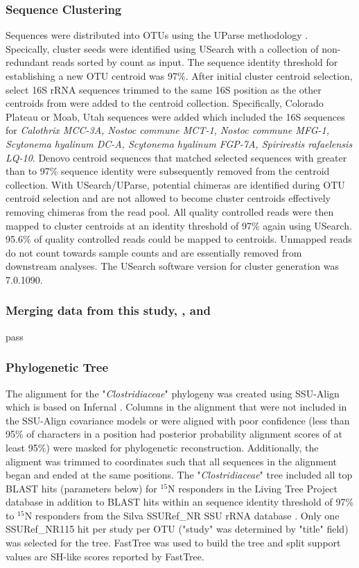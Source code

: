 \subsubsection{Sequence Clustering}
Sequences were distributed into OTUs using the UParse methodology \cite{23955772}. Specically, cluster seeds were identified using USearch with a collection of non-redundant reads sorted by count as input. The sequence identity threshold for establishing a new OTU centroid was 97\%. After initial cluster centroid selection, select 16S rRNA sequences trimmed to the same 16S position as the other centroids from \citet{Yeager} were added to the centroid collection. Specifically, \citet{Yeager} Colorado Plateau or Moab, Utah sequences were added which included the 16S sequences for \textit{Calothrix MCC-3A, Nostoc commune MCT-1, Nostoc commune MFG-1, Scytonema hyalinum DC-A, Scytonema hyalinum FGP-7A, Spirirestis rafaelensis LQ-10}. Denovo centroid sequences that matched selected \citet{Yeager} sequences with greater than to 97\% sequence identity were subsequently removed from the centroid collection. With USearch/UParse, potential chimeras are identified during OTU centroid selection and are not allowed to become cluster centroids effectively removing chimeras from the read pool. All quality controlled reads were then mapped to cluster centroids at an identity threshold of 97\% again using USearch. 95.6\% of quality controlled reads could be mapped to centroids. Unmapped reads do not count towards sample counts and are essentially removed from downstream analyses. The USearch software version for cluster generation was 7.0.1090.

\subsubsection{Merging data from this study, \citet{Garcia_Pichel_2013}, and \citet{Steven_2013}}
pass

\subsubsection{Phylogenetic Tree}
The alignment for the "\textit{Clostridiaceae}" phylogeny was created using SSU-Align which is based on Infernal \cite{24008419, 19307242}. Columns in the alignment that were not included in the SSU-Align covariance models or were aligned with poor confidence (less than 95\% of characters in a position had posterior probability alignment scores of at least 95\%) were masked for phylogenetic reconstruction. Additionally, the aligment was trimmed to coordinates such that all sequences in the alignment began and ended at the same positions. The "\textit{Clostridiaceae}" tree included all top BLAST hits (parameters below) for $^{15}$N responders in the Living Tree Project database \cite{Yarza_2008} in addition to BLAST hits within an sequence identity threshold of 97\% to $^{15}$N responders from the Silva SSURef\_NR SSU rRNA database \cite{17947321}. Only one SSURef\_NR115 hit per study per OTU ("study" was determined by "title" field) was selected for the tree. FastTree \cite{20224823} was used to build the tree and split support values are SH-like scores reported by FastTree.

